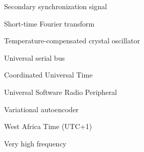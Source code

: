 \begin{description}[style=sameline, leftmargin=3.6cm, labelwidth=3.3cm, font=\normalfont, itemsep=0pt]
  \item[SSS]          Secondary synchronization signal
  \item[STFT]         Short-time Fourier transform
  \item[TCXO]         Temperature-compensated crystal oscillator
  \item[USB]          Universal serial bus
  \item[UTC]          Coordinated Universal Time
  \item[USRP]         Universal Software Radio Peripheral
  \item[VAE]          Variational autoencoder
  \item[WAT]          West Africa Time (UTC+1)
  \item[VHF]          Very high frequency
\end{description}

